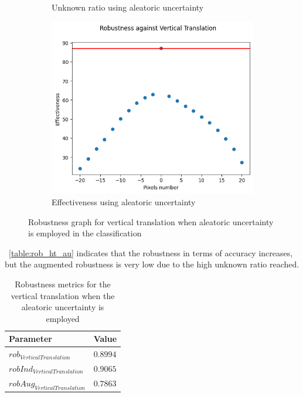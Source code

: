 \begin{figure}[h]
\begin{subfigure}{.33\textwidth}
		\caption{Unknown ratio using aleatoric uncertainty}
		\label{fig:vt_au_unkn}
	\end{subfigure}%
	\begin{subfigure}{.33\textwidth}
		\centering
		\includegraphics[width=0.9\linewidth]{ImageFiles/EvalBNN/VT/AU/eff}
		\caption{Effectiveness using aleatoric uncertainty}
		\label{fig:vt_au_eff}
	\end{subfigure}
	\caption{Robustness graph for vertical translation when aleatoric uncertainty is employed in the classification}
	\label{fig:vt_au}
\end{figure}

\Tab~\ref{table:rob_ht_au} indicates that the robustness in terms of accuracy increases, but the augmented robustness is very low due to the high unknown ratio reached.

\begin{table}[h]
	\centering
	\begin{tabular}{|| l | l ||} 
		\hline
		\textbf{Parameter} & \textbf{Value} \\
		\hline
		\hline
		$rob_{VerticalTranslation}$ & $0.8994$ \\
		$robInd_{VerticalTranslation}$ & $0.9065$ \\
		$robAug_{VerticalTranslation}$ & $0.7863$ \\	
		\hline
	\end{tabular}	
	\caption{Robustness metrics for the vertical translation when the aleatoric uncertainty is employed}
	\label{table:rob_vt_au}
\end{table}

